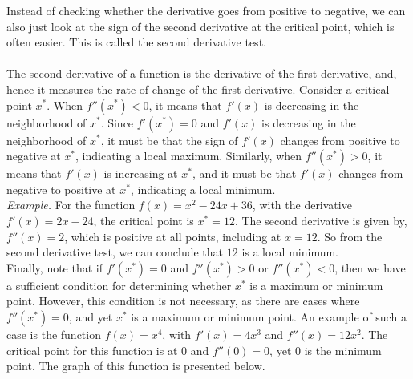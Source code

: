 \documentclass{./../Latex/handout}
\begin{document}
Instead of checking whether the derivative goes from positive to negative, we can also just look at the sign of the second derivative at the critical point, which is often easier. This is called the second derivative test. \\

 \\

The second derivative of a function is the derivative of the first derivative, and, hence it measures the rate of change of the first derivative. Consider a critical point $x^*$. When $f''(x^*)<0$, it means that $f'(x)$ is decreasing in the neighborhood of $x^*$. Since $f'(x^*)=0$ and $f'(x)$ is decreasing in the neighborhood of $x^*$, it must be that the sign of $f'(x)$ changes from positive to negative at $x^*$, indicating a local maximum. Similarly, when $f''(x^*)>0$, it means that $f'(x)$ is increasing at $x^*$, and it must be that $f'(x)$ changes from negative to positive at $x^*$, indicating a local minimum. \\

\textit{Example.} For the function $f(x) = x^2 -24 x + 36 $, with the derivative $f'(x)=2x-24$, the critical point is $x^*=12$. The second derivative is given by, $ f''(x) = 2 $, which is positive at all points, including at $x=12$. So from the second derivative test, we can conclude that $12$ is a local minimum. \\

Finally, note that if $f'(x^*)=0$ and $f''(x^*)>0$ or $f''(x^*)<0$, then we have a sufficient condition for determining whether $x^*$ is a maximum or minimum point. However, this condition is not necessary, as there are cases where $f''(x^*)=0$, and yet $x^*$ is a maximum or minimum point. An example of such a case is the function $f(x)=x^4$, with $f'(x)=4x^3$ and $f''(x)=12x^2$. The critical point for this function is at $0$ and $f''(0)=0$, yet $0$ is the minimum point. The graph of this function is presented below. 
\end{document}
